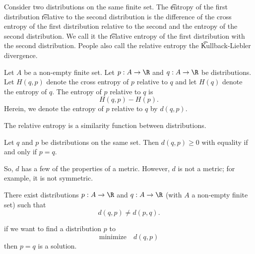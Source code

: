 


Consider two distributions on the same finite set.
The \t{entropy} of the first distribution \t{relative}{} to the second distribution is the difference of the cross entropy of the first distribution relative to the second and the entropy of the second distribution.
We call it the \t{relative entropy} of the first distribution with the second distribution.
People also call the relative entropy the \t{Kullback-Liebler divergence}.


Let $A$ be a non-empty finite set.
Let $p: A \to \R$ and $q: A \to \R$ be distributions.
Let $H(q, p)$ denote the cross entropy of $p$ relative to $q$ and let $H(q)$ denote the entropy of $q$.
The entropy of $p$ relative to $q$ is $$H(q, p) - H(p).$$
Herein, we denote the entropy of $p$ relative to $q$ by $d(q, p)$.


The relative entropy is a similarity function between distributions.

\begin{prop}

Let $q$ and $p$ be distributions
on the same set.
Then $d(q, p) \geq 0$ with equality if and only if $p = q$.

\end{prop}

So, $d$ has a few of the properties of a metric.
However, $d$ is not a metric; for example, it is not symmetric.

\begin{prop}
  There exist distributions $p: A \to \R$ and $q: A \to \R$ (with $A$ a non-empty finite set) such that $$d(q, p) \neq d(p, q).$$
\end{prop}


if we want to find a distribution $p$
to
\[
  \text{minimize} \quad d(q, p)
\]
then $p = q$ is a solution.
